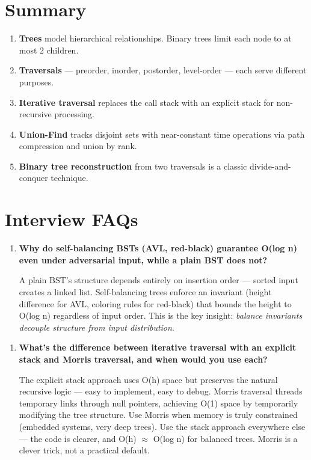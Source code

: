 \section{Summary}

\begin{enumerate}
\item \textbf{Trees} model hierarchical relationships. Binary trees limit each node to at most 2 children.
\item \textbf{Traversals} — preorder, inorder, postorder, level-order — each serve different purposes.
\item \textbf{Iterative traversal} replaces the call stack with an explicit stack for non-recursive processing.
\item \textbf{Union-Find} tracks disjoint sets with near-constant time operations via path compression and union by rank.
\item \textbf{Binary tree reconstruction} from two traversals is a classic divide-and-conquer technique.
\end{enumerate}

\section{Interview FAQs}

\begin{enumerate}
\item \textbf{Why do self-balancing BSTs (AVL, red-black) guarantee O(log n) even under adversarial input, while a plain BST does not?}

A plain BST's structure depends entirely on insertion order --- sorted input creates a linked list. Self-balancing trees enforce an invariant (height difference for AVL, coloring rules for red-black) that bounds the height to O(log n) regardless of input order. This is the key insight: \emph{balance invariants decouple structure from input distribution}.
\end{enumerate}

\begin{enumerate}
\item \textbf{What's the difference between iterative traversal with an explicit stack and Morris traversal, and when would you use each?}

The explicit stack approach uses O(h) space but preserves the natural recursive logic --- easy to implement, easy to debug. Morris traversal threads temporary links through null pointers, achieving O(1) space by temporarily modifying the tree structure. Use Morris when memory is truly constrained (embedded systems, very deep trees). Use the stack approach everywhere else --- the code is clearer, and O(h) $\approx$ O(log n) for balanced trees. Morris is a clever trick, not a practical default.
\end{enumerate}

